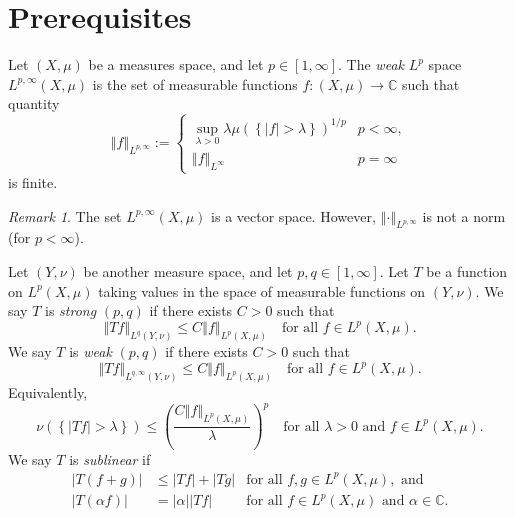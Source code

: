\documentclass{book}
\newcommand{\bbC}{\mathbb{C}}
\newcommand{\abs}[1]{\left\lvert {#1} \right\rvert}
\newcommand{\norm}[1]{\left\Vert {#1} \right\Vert}
\newcommand{\set}[1]{\left\{ {#1} \right\}}
\newcommand{\parens}[1]{\left( {#1} \right)}
\theoremstyle{definition}
\theoremstyle{remark}
\newtheorem{remark}[theorem]{Remark}
\numberwithin{equation}{chapter}
\begin{document}
\section{Prerequisites}
Let $(X,\mu)$ be a measures space, and let $p \in [1,\infty]$. The \textit{weak} $L^p$ space $L^{p,\infty}(X,\mu)$ is the set of measurable functions $f \colon (X,\mu) \to \bbC$ such that quantity
\begin{equation}
    \norm{f}_{L^{p,\infty}} := 
    \begin{cases}
        \sup_{\lambda > 0} \lambda \mu(\set{\abs{f} > \lambda})^{1/p} & p < \infty, \\
        \norm{f}_{L^\infty}                                           & p = \infty
    \end{cases}
\end{equation}
is finite.
\begin{remark}
    The set $L^{p,\infty}(X,\mu)$ is a vector space. However, $\norm{\cdot}_{L^{p,\infty}}$ is not a norm (for $p < \infty$).
\end{remark}

Let $(Y,\nu)$ be another measure space, and let $p,q \in [1,\infty]$. Let $T$ be a function on $L^p(X,\mu)$ taking values in the space of measurable functions on $(Y,\nu)$. We say $T$ is \textit{strong} $(p,q)$ if there exists $C > 0$ such that 
\begin{equation}
    \norm{Tf}_{L^q(Y,\nu)} \leq C \norm{f}_{L^p(X,\mu)} \quad \text{for all } f \in L^p(X,\mu).
\end{equation}
We say $T$ is \textit{weak} $(p,q)$ if there exists $C > 0$ such that 
\begin{equation}
    \norm{Tf}_{L^{q,\infty}(Y,\nu)} \leq C \norm{f}_{L^p(X,\mu)} \quad \text{for all } f \in L^p(X,\mu).
\end{equation}
Equivalently, 
\begin{equation}
    \nu(\set{\abs{Tf} > \lambda}) \leq \parens{ \frac{C \norm{f}_{L^p(X,\mu)}}{\lambda} }^p \quad \text{for all } \lambda > 0 \text{ and } f \in L^p(X,\mu).
\end{equation}
We say $T$ is \textit{sublinear} if 
\begin{equation} \begin{aligned}
    \abs{T(f+g)}      &\leq \abs{Tf} + \abs{Tg} & \text{for all } f,g \in L^p(X,\mu), \text{ and} \\
    \abs{T(\alpha f)} &= \abs{\alpha}\abs{Tf}   & \text{for all } f \in L^p(X,\mu) \text{ and } \alpha \in \bbC.
\end{aligned} \end{equation}
\end{document}
